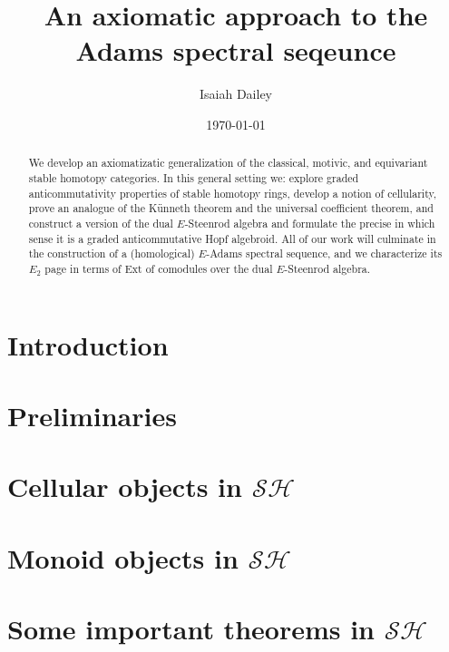 \documentclass[openany, amssymb]{amsart}
\title{An axiomatic approach to the Adams spectral seqeunce}
\author{Isaiah Dailey}
\date{\today}
\theoremstyle{plain}
\theoremstyle{definition}
\newcommand{\cSH}{\mathcal{SH}}
\newcommand{\Ext}{\mathrm{Ext}}
\newcommand{\0}{\mathbf{0}}
\renewcommand{\(}{\left(}
\renewcommand{\)}{\right)}
\renewcommand{\1}{\mbf{1}}
\begin{document}
\begin{abstract}
  We develop an axiomatizatic generalization of the classical, motivic, and equivariant stable homotopy categories. In this general setting we: explore graded anticommutativity properties of stable homotopy rings,  develop a notion of cellularity, prove an analogue of the K\"unneth theorem and the universal coefficient theorem, and construct a version of the dual $E$-Steenrod algebra and formulate the precise in which sense it is a graded anticommutative Hopf algebroid. All of our work will culminate in the construction of a (homological) $E$-Adams spectral sequence, and we characterize its $E_2$ page in terms of $\Ext$ of comodules over the dual $E$-Steenrod algebra.
\end{abstract}

\maketitle

\tableofcontents


\section{Introduction}\label{section:intro}



\section{Preliminaries}\label{section:prelims}



\section{Cellular objects in \texorpdfstring{$\cSH$}{SH}}\label{section:cellular}



\section{Monoid objects in \texorpdfstring{$\cSH$}{SH}}\label{section:monoid_in_SH}



\section{Some important theorems in \texorpdfstring{$\cSH$}{SH}}\label{section:important}
\end{document}
